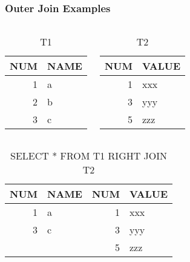 \documentclass[dvipsnames]{beamer}
\theoremstyle{plain}
\begin{document}
\begin{frame}[fragile]
  \frametitle{Outer Join Examples}

  \begin{example}
    \begin{columns}[t]
      \begin{tiny}
      \begin{table}
        \caption{T1}
        \begin{tabular}{|r|l|}\hline
NUM & NAME \\\hline\hline
  1 & a    \\\hline
  2 & b    \\\hline
  3 & c    \\\hline
        \end{tabular}
      \end{table}
      \end{tiny}

      \begin{tiny}
      \begin{table}
        \caption{T2}
        \begin{tabular}{|r|l|}\hline
NUM & VALUE \\\hline\hline
  1 & xxx   \\\hline
  3 & yyy   \\\hline
  5 & zzz   \\\hline
        \end{tabular}
      \end{table}
      \end{tiny}
    \end{columns}

    \pause
    \begin{center}
      \begin{tiny}
      \begin{table}
        \caption{SELECT * FROM T1 RIGHT JOIN T2}
        \begin{tabular}{|r|l|r|l|}\hline
NUM & NAME & NUM & VALUE \\\hline\hline
  1 & a    &   1 & xxx   \\\hline
  3 & c    &   3 & yyy   \\\hline
    &      &   5 & zzz   \\\hline
        \end{tabular}
      \end{table}
      \end{tiny}
    \end{center}
  \end{example}
\end{frame}
\end{document}
